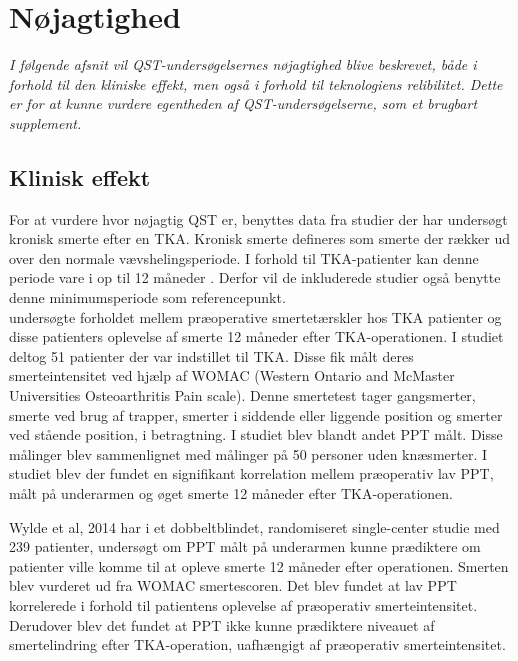 
\section{Nøjagtighed}
\textit{I følgende afsnit vil QST-undersøgelsernes nøjagtighed blive beskrevet, både i forhold til den kliniske effekt, men også i forhold til teknologiens relibilitet. Dette er for at kunne vurdere egentheden af QST-undersøgelserne, som et brugbart supplement.}

\subsection{Klinisk effekt}
For at vurdere hvor nøjagtig QST er, benyttes data fra studier der har undersøgt kronisk smerte efter en TKA. Kronisk smerte defineres som smerte der rækker ud over den normale vævshelingsperiode. I forhold til TKA-patienter kan denne periode vare i op til 12 måneder \citep{Wylde2015}. Derfor vil de inkluderede studier også benytte denne minimumsperiode som referencepunkt. \\

 undersøgte forholdet mellem præoperative smertetærskler hos TKA patienter og disse patienters oplevelse af smerte 12 måneder efter TKA-operationen. I studiet deltog 51 patienter der var indstillet til TKA. Disse fik målt deres smerteintensitet ved hjælp af WOMAC (Western Ontario and McMaster Universities Osteoarthritis Pain scale). Denne smertetest tager gangsmerter, smerte ved brug af trapper, smerter i siddende eller liggende position og smerter ved stående position, i betragtning.  I studiet blev blandt andet PPT målt. Disse målinger blev sammenlignet med målinger på 50 personer uden knæsmerter. I studiet blev der fundet en signifikant korrelation mellem præoperativ lav PPT, målt på underarmen og øget smerte 12 måneder efter TKA-operationen.

Wylde et al, 2014 har i et dobbeltblindet, randomiseret single-center studie med 239 patienter, undersøgt om PPT målt på underarmen kunne prædiktere om patienter ville komme til at opleve smerte 12 måneder efter operationen. Smerten blev vurderet ud fra WOMAC smertescoren. Det blev fundet at lav PPT korrelerede i forhold til patientens oplevelse af præoperativ smerteintensitet. Derudover blev det fundet at PPT ikke kunne prædiktere niveauet af smertelindring efter TKA-operation, uafhængigt af præoperativ smerteintensitet.

